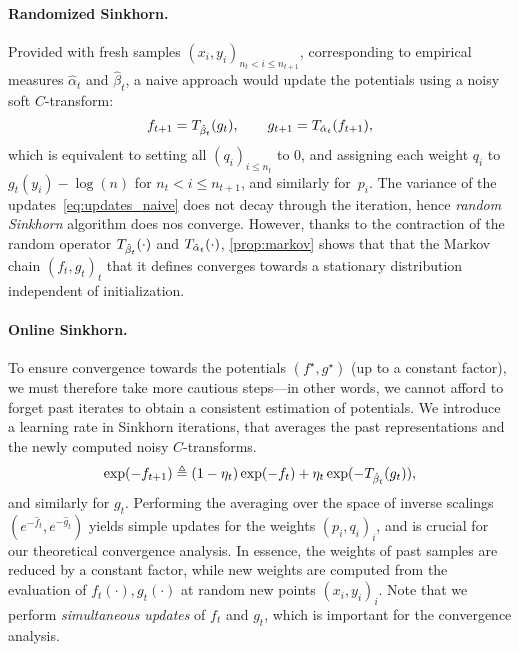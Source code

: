 \paragraph{Randomized Sinkhorn.}
Provided with fresh samples $(x_i, y_i)_{n_t < i \leq n_{t+1}}$, 
corresponding to empirical measures $\hat \alpha_t$ and $\hat \beta_t$, a naive approach would 
 update the potentials using a noisy soft $C$-transform:
\begin{equation}\label{eq:updates_naive}
     f_{t+1} = \Ctrans{g_t}{\hat \beta_t},
    \qquad g_{t+1} = \Ctrans{f_{t+1}}{\hat \alpha_t},
\end{equation}
which is equivalent to setting all $(q_i)_{i \leq n_t}$ to $0$, and assigning each weight
 $q_i$ to $g_t(y_i) - \log(n)$ for $n_t < i \leq  n_{t+1}$, and similarly for~$p_i$.
%
The variance of the updates~\eqref{eq:updates_naive} does not decay through the
iteration, hence \textit{random Sinkhorn} algorithm does nos converge.
However, thanks to the contraction of the random operator $\Ctrans{\cdot}{\hat
\beta_t}$ and $\Ctrans{\cdot}{\hat \alpha_t}$, \autoref{prop:markov} shows that
that the Markov chain ${(f_t, g_t)}_t$ that it defines converges towards a
stationary distribution independent of initialization.

\paragraph{Online Sinkhorn.}

To ensure convergence towards the potentials $(f^\star, g^\star)$ (up to a
constant factor), we must therefore take more cautious steps---in other words,
we cannot afford to forget past iterates to obtain a consistent estimation of
potentials. We introduce a learning rate in Sinkhorn iterations, that averages
the past representations and the newly computed noisy $C$-transforms.
\begin{equation}\label{eq:updates}
    \exp(-f_{t+1})
    \eqdef (1 - \eta_t) \exp(-f_t) 
    + \eta_t 
    \exp(-\Ctrans{g_t}{\hat \beta_t}),
\end{equation}
and similarly for $g_t$. Performing the averaging over the space of inverse
scalings $(e^{-\hat f_{t}},e^{-\hat g_{t}})$ yields simple updates for the
weights ${(p_i,q_i)}_i$, and is crucial for our theoretical convergence
analysis. In essence, the weights of past samples are reduced by a constant
factor, while new weights are computed from the evaluation of $f_t(\cdot),
g_t(\cdot)$ at random new points ${(x_i, y_i)}_i$. Note that we perform
\textit{simultaneous updates} of $f_t$ and $g_t$, which is important for the
convergence analysis.

